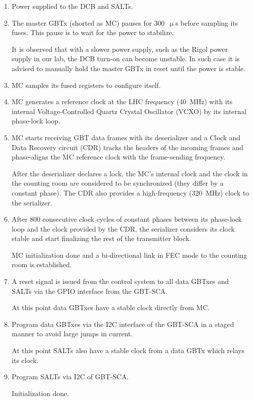 \begin{enumerate}
    \item Power supplied to the DCB and SALTs.
    \item The master GBTx (shorted as MC) pauses for 300~$\upmu$s before
        sampling its fuses. This pause is to wait for the power to stabilize.

        It is observed that with a slower power supply,
        such as the Rigol power supply in our lab,
        the DCB turn-on can become unstable.
        In such case it is advised to manually hold the master GBTx in reset
        until the power is stable.

    \item MC samples its fused registers to configure itself.

    \item MC generates a reference clock at the LHC frequency (40~MHz) with
        its internal Voltage-Controlled Quartz Crystal Oscillator (VCXO)
        by its internal phase-lock loop.

    \item MC starts receiving GBT data frames with its deserializer and a Clock
        and Data Recovery circuit (CDR) tracks the headers of the incoming
        frames and phase-aligns the MC reference clock with the frame-sending
        frequency.

        After the deserializer declares a lock,
        the MC's internal clock and the clock in the counting room are
        considered to be synchronized
        (they differ by a constant phase).
        The CDR also provides a high-frequency (320~MHz) clock to the
        serializer.
    \item
        After 800 consecutive clock cycles of constant phases between its
        phase-lock loop and the clock provided by the CDR,
        the serializer considers its clock stable and start finalizing the rest
        of the transmitter block.

        MC initialization done and a bi-directional link in FEC mode to the
        counting room is established.

    \item A reset signal is issued from the control system to all data GBTxes
        and SALTs via the GPIO interface from the GBT-SCA.

        At this point data GBTxes have a stable clock directly from MC.

    \item Program data GBTxes via the I2C interface of the GBT-SCA in a staged
        manner to avoid large jumps in current.

        At this point SALTs also have a stable clock from a data GBTx which
        relays its clock.

    \item Program SALTs via I2C of GBT-SCA.

        Initialization done.
\end{enumerate}


